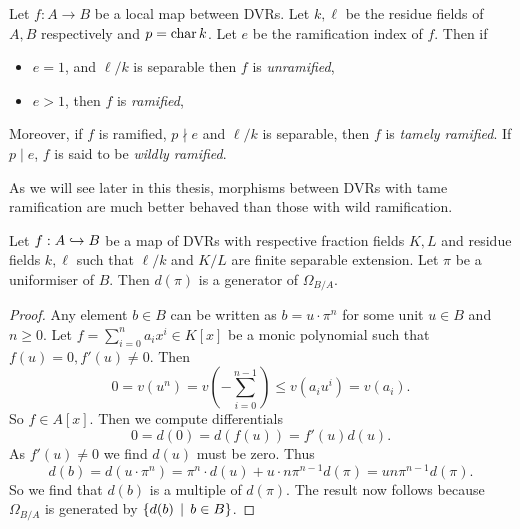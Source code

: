 \begin{definition}
	Let $f: A \to B$ be a local map between DVRs. 
	Let $k, \ell$ be the residue fields of $A, B$ respectively and $p = \operatorname{char} k$.
	Let $e$ be the ramification index of $f$.
	Then if
	\begin{itemize}
		\item $e = 1$, and $\ell / k$ is separable then $f$ is \emph{unramified}, 
		\item $e > 1$, then $f$ is \emph{ramified},
	\end{itemize}
	Moreover, if $f$ is ramified, $p \nmid e$ and $\ell / k$ is separable, then $f$ is \emph{tamely ramified}. 
	If $p \mid e$, $f$ is said to be \emph{wildly ramified}. 
\end{definition}
As we will see later in this thesis, morphisms between DVRs with tame ramification are much better behaved than those with wild ramification. 

\begin{lemma}\label{lem:generator_canonical_bundle_DVR}
	Let $f: A \hookrightarrow B$ be a map of DVRs with respective fraction fields $K, L$ and residue fields $k, \ell$ such that $\ell / k$ and $K / L$ are finite separable extension. 
	Let $\pi$ be a uniformiser of $B$. 
	Then $d(\pi)$ is a generator of $\Omega_{B / A}$. 
\end{lemma}
\begin{proof}
	Any element $b \in B$ can be written as $b = u \cdot \pi^{n} $ for some unit $u \in B$ and $n \ge 0$. 
	Let $f = \sum_{i = 0}^{n}  a_i x^{i} \in K[x]$ be a monic polynomial such that $f(u) = 0, f'(u) \ne 0$. 
	Then  \[
		0 = v(u^{n}) = v\left(- \sum_{i = 0}^{n-1}\right) \le v(a_i u^{i}) = v(a_i) 
	.\] 
	So $f \in A[x]$. 
	Then we compute differentials \[
		0 = d(0) = d(f(u)) = f'(u) d(u)
	.\] 
	As $f'(u) \ne 0$ we find $d(u)$ must be zero. 
	Thus \[
		d(b) = d(u\cdot \pi^{n}) = \pi^{n}\cdot d(u) + u\cdot  n \pi^{n-1}d(\pi) = un\pi^{n-1} d(\pi)
	.\] 
	So we find that $d(b)$ is a multiple of $d(\pi)$. 
	The result now follows because $\Omega_{B / A}$ is generated by $\{d(b) \st b \in B\} $.  
\end{proof}


